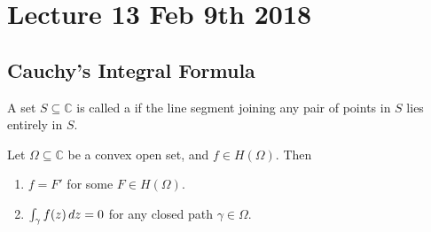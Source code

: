 \documentclass[11pt, oneside]{book}
\begin{document}


\chapter{Lecture 13 Feb 9th 2018}
	\label{chapter:lecture_13_feb_9th_2018}

\section{Cauchy's Integral Formula} %
\label{sec:cauchy_s_integral_formula}

\begin{defn}\label{defn:convex_set}
	A set $S \subseteq \mathbb{C}$ is called a  if the line segment joining any pair of points in $S$ lies entirely in $S$.
\end{defn}

\begin{thm}\label{thm:cauchy_s_theorem_for_convex_set}
	Let $\Omega \subseteq \mathbb{C}$ be a convex open set, and $f \in H(\Omega)$. Then
	\begin{enumerate}
	 	\item $f = F'$ for some $F \in H(\Omega)$.
	 	\item $\int_{\gamma} f(z) \mathop{}\!d{z} = 0$ for any closed path $\gamma \in \Omega$.
	 \end{enumerate} 
\end{thm}
\end{document}
